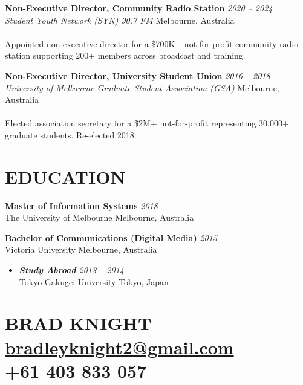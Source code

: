 \documentclass[margin]{res}
\makeatletter
\newcommand{\email}{\href{mailto:bradleyknight2@gmail.com}{bradleyknight2@gmail.com}}
\newcommand{\mobNumber}{+61 403 833 057}
\makeatother
\begin{document}
\begin{resume}
    \textbf{Non-Executive Director, Community Radio Station} \hfill \textit{2020 -- 2024} \\
    \textit{Student Youth Network (SYN) 90.7 FM} \hfill Melbourne, Australia\\\\
    {Appointed non-executive director for a \$700K+ not-for-profit community radio station supporting 200+ members across broadcast and training.}

        \vspace{1mm}

        \textbf{Non-Executive Director, University Student Union} \hfill \textit{2016 -- 2018} \\
        \textit{University of Melbourne Graduate Student Association (GSA)} \hfill Melbourne, Australia\\\\
        {Elected association secretary for a \$2M+ not-for-profit representing 30,000+ graduate students. Re-elected 2018.}

        \vspace{1mm}

        \section{EDUCATION}
        \textbf{Master of Information Systems} \hfill \textit{2018}\\{The University of Melbourne \hfill Melbourne, Australia}

        \textbf{Bachelor of Communications (Digital Media)} \hfill \textit{2015}\\{Victoria University \hfill Melbourne, Australia}
        \vspace{1mm}
        \begin{itemize} \itemsep -8pt
            \item \textbf{\textit{Study Abroad}} \hfill \textit{2013 -- 2014}\\
            Tokyo Gakugei University \hfill Tokyo, Japan
        \end{itemize}
        \vspace{1mm}

        \vspace{\fill}

        \section{BRAD KNIGHT
               \textmd{\email{}\\
                \mobNumber{}}}

    \end{resume}
\end{document}
